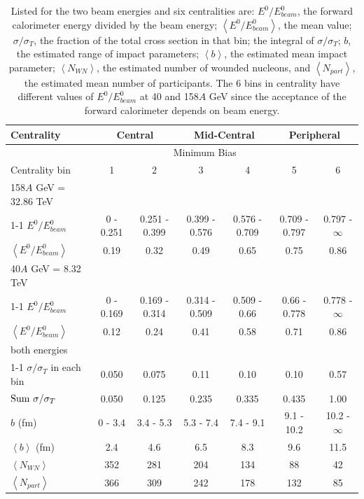 \documentclass[aps,prc,superscriptaddress,showpacs,floatfix,nofootinbib]{revtex4}
\newcommand{\mean}[1]{\left\langle #1 \right\rangle}
\begin{document}
\begin{table}[hbt!]
\caption {Listed for the two beam energies and six centralities are: 
 $E^0/E^0_{beam}$, the forward calorimeter energy divided by the beam
 energy; $\mean{E^0/E^0_{beam}}$, the mean value; $\sigma/\sigma_T$,
 the fraction of the total cross section in that bin; the integral of
 $\sigma/\sigma_T$; $b$, the estimated range of impact parameters;
 $\mean{b}$, the estimated mean impact parameter; $\mean{N_{WN}}$, the
 estimated number of wounded nucleons, and $\mean{N_{part}}$, the
 estimated mean number of participants. The 6 bins in centrality have
 different values of $E^0/E^0_{beam}$ at 40 and 158$A$ GeV since
 the acceptance of the forward calorimeter depends on beam energy.}
\begin{center}
\begin{ruledtabular}
\begin{tabular}{l|c|c|c|c|c|c}
Centrality &
\multicolumn{2}{c|}{Central}    & 
\multicolumn{2}{c|}{Mid-Central}        & 
\multicolumn{2}{c}{Peripheral} \\ \hline
& \multicolumn{5}{c|}{Minimum Bias} \\ \hline
Centrality bin    & 1     & 2     & 3     & 4     & 5     & 6     \\ \hline
158$A$ GeV = 32.86 TeV    & & & & & & \\ \cline{1-1}
$E^0/E^0_{beam}$ & 0 - 0.251 & 0.251 - 0.399 & 0.399 - 0.576 & 0.576 -
0.709 & 0.709 - 0.797 & 0.797 - $\infty$ \\
$\mean{E^0/E^0_{beam}}$ & 0.19 & 0.32 & 0.49 & 0.65 & 0.75 & 0.86 \\ \hline
40$A$ GeV = 8.32 TeV    & & & & & & \\ \cline{1-1}
$E^0/E^0_{beam}$ & 0 - 0.169 & 0.169 - 0.314 & 0.314 - 0.509 & 0.509 -
0.66 & 0.66 - 0.778 & 0.778 - $\infty$ \\
$\mean{E^0/E^0_{beam}}$ & 0.12 & 0.24 & 0.41 & 0.58 & 0.71 & 0.86 \\ \hline
both energies & & & & & & \\ \cline{1-1}
$\sigma/\sigma_T$ in each bin& 0.050 & 0.075 & 0.11  & 0.10  & 0.10  & 0.57\\
${\rm Sum}~\sigma/\sigma_T$&   0.050 & 0.125 & 0.235 & 0.335 & 0.435 & 1.00  \\
$b$ (fm) & 0 - 3.4 & 3.4 - 5.3 & 5.3 - 7.4 & 7.4 - 9.1 & 9.1 - 10.2 & 10.2 - $\infty$\\
$\mean{b}$ (fm)         & 2.4   & 4.6   & 6.5   & 8.3   & 9.6  & 11.5 \\
$\mean{N_{WN}}$         & 352   & 281   & 204   & 134   &  88  & 42 \\
$\mean{N_{part}}$       & 366   & 309   & 242   & 178   & 132  & 85 \\
\end{tabular}
\end{ruledtabular}
\end{center}
\label{tbl:centrality}
\end{table}
\end{document}
